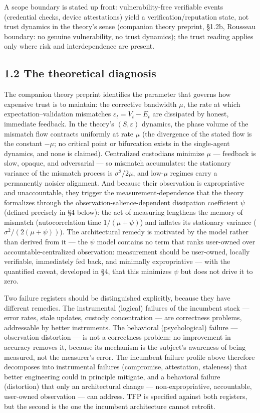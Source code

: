 \documentclass[11pt,twocolumn]{article}
\begin{document}
A scope boundary is stated up front: vulnerability-free verifiable
events (credential checks, device attestations) yield a
verification/reputation state, not trust dynamics in the theory's sense
(companion theory preprint, §1.2b, Rousseau boundary: no genuine vulnerability, no trust
dynamics); the trust reading applies only where risk and interdependence
are present.

\subsection*{1.2 The theoretical
diagnosis}

The companion theory preprint identifies the parameter that governs how expensive trust is to maintain: the
corrective bandwidth \(\mu\), the rate at which expectation--validation
mismatches \(\varepsilon_t = V_t - E_t\) are dissipated by honest,
immediate feedback. In the theory's \((S, \varepsilon)\) dynamics, the
phase volume of the mismatch flow contracts uniformly at rate \(\mu\)
(the divergence of the stated flow is the constant \(-\mu\); no critical
point or bifurcation exists in the single-agent dynamics, and none is
claimed). Centralized custodians minimize \(\mu\) --- feedback is slow,
opaque, and adversarial --- so mismatch accumulates: the stationary
variance of the mismatch process is \(\sigma^2/2\mu\), and low-\(\mu\)
regimes carry a permanently noisier alignment. And because their
observation is expropriative and unaccountable, they trigger the
measurement-dependence that the theory formalizes through the
observation-salience-dependent dissipation coefficient \(\psi\) (defined
precisely in §4 below): the act of measuring lengthens the memory of
mismatch (autocorrelation time \(1/(\mu+\psi)\)) and inflates its
stationary variance (\(\sigma^2/(2(\mu+\psi))\)). The architectural
remedy is motivated by the model rather than derived from it --- the
\(\psi\) model contains no term that ranks user-owned over
accountable-centralized observation: measurement should be user-owned,
locally
verifiable, immediately fed back, and minimally expropriative --- with
the quantified caveat, developed in §4, that this minimizes \(\psi\) but
does not drive it to zero.

Two failure registers should be distinguished explicitly, because they
have different remedies. The instrumental (logical) failures of the
incumbent stack --- error rates, stale updates, custody concentration
--- are correctness problems, addressable by better instruments. The
behavioral (psychological) failure --- observation distortion --- is not
a correctness problem: no improvement in accuracy removes it, because
its mechanism is the subject's awareness of being measured, not the
measurer's error. The incumbent failure profile above therefore
decomposes into instrumental failures (compromise, attestation,
staleness) that better engineering could in principle mitigate, and a
behavioral failure (distortion) that only an architectural change ---
non-expropriative, accountable, user-owned observation --- can address.
TFP is specified against both registers, but the second is the one the
incumbent architecture cannot retrofit.
\end{document}
